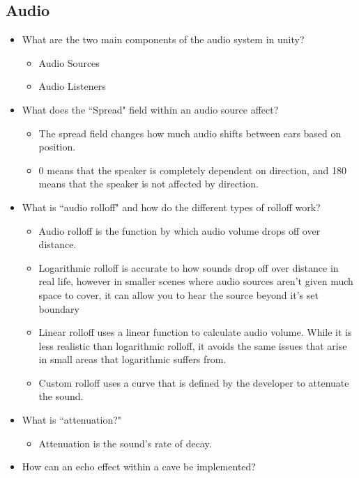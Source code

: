 \documentclass{article}
\begin{document}
\subsection{Audio}
\begin{itemize}
    \item What are the two main components of the audio system in unity?
    \begin{itemize}
        \item Audio Sources
        \item Audio Listeners
    \end{itemize}
    \item What does the ``Spread" field within an audio source affect?
    \begin{itemize}
        \item The spread field changes how much audio shifts between ears based on position.
        \item 0 means that the speaker is completely dependent on direction, and 180 means that the speaker is not affected by direction.
    \end{itemize}
    \item What is ``audio rolloff" and how do the different types of rolloff work?
    \begin{itemize}
        \item Audio rolloff is the function by which audio volume drops off over distance.
        \item Logarithmic rolloff is accurate to how sounds drop off over distance in real life, however in smaller scenes where audio sources aren't given much space to cover, it can allow you to hear the source beyond it's set boundary
        \item Linear rolloff uses a linear function to calculate audio volume. While it is less realistic than logarithmic rolloff, it avoids the same issues that arise in small areas that logarithmic suffers from.
        \item Custom rolloff uses a curve that is defined by the developer to attenuate the sound.
    \end{itemize}
    \item What is ``attenuation?"
    \begin{itemize}
        \item Attenuation is the sound's rate of decay.
    \end{itemize}
    \item How can an echo effect within a cave be implemented?
    \begin{itemize}

\end{itemize}
\end{itemize}
\end{document}
